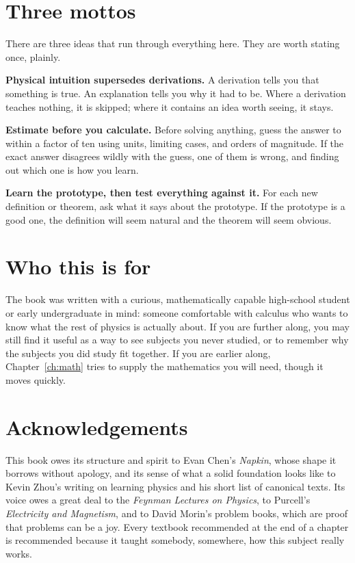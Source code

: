 \section*{Three mottos}

There are three ideas that run through everything here. They are worth stating once, plainly.

\begin{keyidea}[MOTTO 1]
\textbf{Physical intuition supersedes derivations.} A derivation tells you that something is true. An explanation tells you why it had to be. Where a derivation teaches nothing, it is skipped; where it contains an idea worth seeing, it stays.
\end{keyidea}

\begin{keyidea}[MOTTO 2]
\textbf{Estimate before you calculate.} Before solving anything, guess the answer to within a factor of ten using units, limiting cases, and orders of magnitude. If the exact answer disagrees wildly with the guess, one of them is wrong, and finding out which one is how you learn.
\end{keyidea}

\begin{keyidea}[MOTTO 3]
\textbf{Learn the prototype, then test everything against it.} For each new definition or theorem, ask what it says about the prototype. If the prototype is a good one, the definition will seem natural and the theorem will seem obvious.
\end{keyidea}

\section*{Who this is for}

The book was written with a curious, mathematically capable high-school student or early undergraduate in mind: someone comfortable with calculus who wants to know what the rest of physics is actually about. If you are further along, you may still find it useful as a way to see subjects you never studied, or to remember why the subjects you did study fit together. If you are earlier along, Chapter~\ref{ch:math} tries to supply the mathematics you will need, though it moves quickly.

\section*{Acknowledgements}

This book owes its structure and spirit to Evan Chen's \emph{Napkin}, whose shape it borrows without apology, and its sense of what a solid foundation looks like to Kevin Zhou's writing on learning physics and his short list of canonical texts. Its voice owes a great deal to the \emph{Feynman Lectures on Physics}, to Purcell's \emph{Electricity and Magnetism}, and to David Morin's problem books, which are proof that problems can be a joy. Every textbook recommended at the end of a chapter is recommended because it taught somebody, somewhere, how this subject really works.
